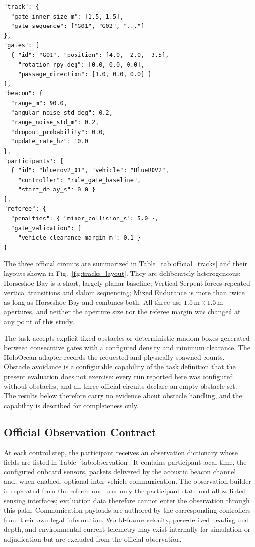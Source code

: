 \begin{lstlisting}[caption={Representative excerpt of a track configuration.}, label={lst:trackjson}]
"track": {
  "gate_inner_size_m": [1.5, 1.5],
  "gate_sequence": ["G01", "G02", "..."]
},
"gates": [
  { "id": "G01", "position": [4.0, -2.0, -3.5],
    "rotation_rpy_deg": [0.0, 0.0, 0.0],
    "passage_direction": [1.0, 0.0, 0.0] }
],
"beacon": {
  "range_m": 90.0,
  "angular_noise_std_deg": 0.2,
  "range_noise_std_m": 0.2,
  "dropout_probability": 0.0,
  "update_rate_hz": 10.0
},
"participants": [
  { "id": "bluerov2_01", "vehicle": "BlueROV2",
    "controller": "rule_gate_baseline",
    "start_delay_s": 0.0 }
],
"referee": {
  "penalties": { "minor_collision_s": 5.0 },
  "gate_validation": {
    "vehicle_clearance_margin_m": 0.1 }
}
\end{lstlisting}

The three official circuits are summarized in Table~\ref{tab:official_tracks} and
their layouts shown in Fig.~\ref{fig:tracks_layout}. They are deliberately
heterogeneous: Horseshoe Bay is a short, largely planar baseline; Vertical
Serpent forces repeated vertical transitions and slalom sequencing; Mixed
Endurance is more than twice as long as Horseshoe Bay and combines both. All
three use $1.5\,\text{m}\times1.5\,\text{m}$ apertures, and neither the aperture
size nor the referee margin was changed at any point of this study.




The  task accepts explicit fixed obstacles or deterministic
random boxes generated between consecutive gates with a configured density and
minimum clearance. The HoloOcean adapter records the requested and physically
spawned counts. Obstacle avoidance is a configurable capability of the task
definition that the present evaluation does not exercise: every run reported here
was configured without obstacles, and all three official circuits declare an
empty obstacle set. The results below therefore carry no evidence about obstacle
handling, and the capability is described for completeness only.

\subsection{Official Observation Contract}
\label{sec:obs_contract}

At each control step, the participant receives an observation dictionary whose
fields are listed in Table~\ref{tab:observation}. It contains participant-local
time, the configured onboard sensors, packets delivered by the acoustic beacon
channel and, when enabled, optional inter-vehicle communication. The observation
builder is separated from the referee and uses only the participant state and
allow-listed sensing interfaces; evaluation data therefore cannot enter the
observation through this path. Communication payloads are authored by the
corresponding controllers from their own legal information. World-frame
velocity, pose-derived heading and depth, and environmental-current telemetry
may exist internally for simulation or adjudication but are excluded from the
official observation.

